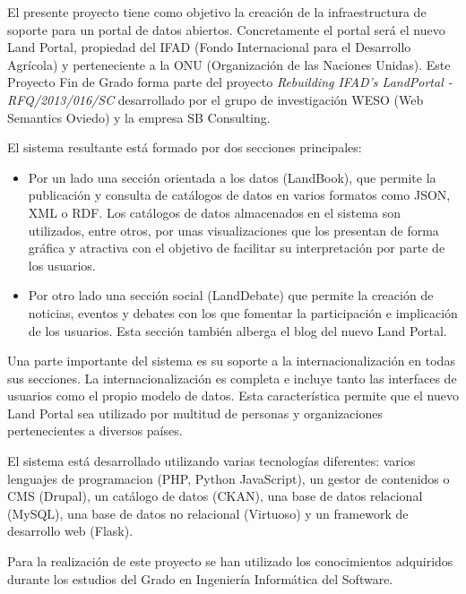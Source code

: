 El presente proyecto tiene como objetivo la creación de la infraestructura de
soporte  para un portal de datos abiertos.  Concretamente
el portal será el nuevo Land Portal, propiedad del IFAD (Fondo Internacional para
el Desarrollo Agrícola) y perteneciente a la ONU (Organización de las Naciones
Unidas).  Este Proyecto Fin de Grado forma parte del proyecto \textit{Rebuilding
IFAD's LandPortal - RFQ/2013/016/SC} desarrollado por el grupo de investigación
WESO (Web Semantics Oviedo) y la empresa SB Consulting.

El sistema resultante está formado por dos secciones principales:
\begin{itemize}
	\item
		Por un lado una sección orientada a los datos (LandBook), que permite
		la publicación y consulta de catálogos de datos en varios formatos
		como JSON, XML o RDF.  Los catálogos de datos almacenados en el
		sistema son utilizados, entre otros, por unas visualizaciones que los
		presentan de forma gráfica y atractiva con el objetivo de facilitar su
		interpretación por parte de los usuarios.
	\item
		Por otro lado una sección social (LandDebate) que permite la creación de
		noticias, eventos y debates con los que fomentar la participación e
		implicación de los usuarios.  Esta sección también alberga el blog
		del nuevo Land Portal.
	
\end{itemize}

Una parte importante del sistema es su soporte a la internacionalización en todas 
sus secciones.  La internacionalización es completa e incluye tanto las interfaces
de usuarios como el propio modelo de datos.  Esta característica permite que el
nuevo Land Portal sea utilizado por multitud de personas y organizaciones
pertenecientes a diversos países.

El sistema está desarrollado utilizando varias tecnologías diferentes: varios lenguajes
de programacion (PHP, Python JavaScript), un gestor de contenidos o CMS (Drupal),
un catálogo de datos (CKAN), una base de datos relacional (MySQL), una base de
datos no relacional (Virtuoso) y un framework de desarrollo web (Flask).

Para la realización de este proyecto se han utilizado los conocimientos adquiridos
durante los estudios del Grado en Ingeniería Informática del Software.